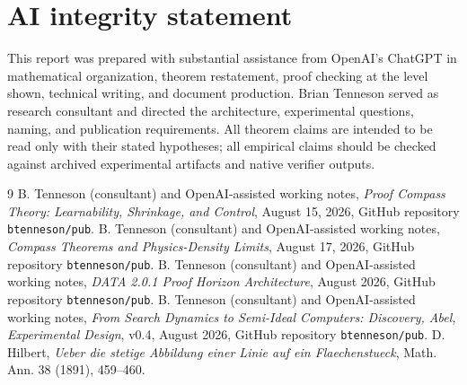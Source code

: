 \documentclass[11pt]{article}
\begin{document}
\section*{AI integrity statement}
This report was prepared with substantial assistance from OpenAI's ChatGPT in mathematical organization, theorem restatement, proof checking at the level shown, technical writing, and document production. Brian Tenneson served as research consultant and directed the architecture, experimental questions, naming, and publication requirements. All theorem claims are intended to be read only with their stated hypotheses; all empirical claims should be checked against archived experimental artifacts and native verifier outputs.
\begin{thebibliography}{9}
 B. Tenneson (consultant) and OpenAI-assisted working notes, \emph{Proof Compass Theory: Learnability, Shrinkage, and Control}, August 15, 2026, GitHub repository \texttt{btenneson/pub}.
 B. Tenneson (consultant) and OpenAI-assisted working notes, \emph{Compass Theorems and Physics-Density Limits}, August 17, 2026, GitHub repository \texttt{btenneson/pub}.
 B. Tenneson (consultant) and OpenAI-assisted working notes, \emph{DATA 2.0.1 Proof Horizon Architecture}, August 2026, GitHub repository \texttt{btenneson/pub}.
 B. Tenneson (consultant) and OpenAI-assisted working notes, \emph{From Search Dynamics to Semi-Ideal Computers: Discovery, Abel, Experimental Design}, v0.4, August 2026, GitHub repository \texttt{btenneson/pub}.
 D. Hilbert, \emph{Ueber die stetige Abbildung einer Linie auf ein Flaechenstueck}, Math. Ann. 38 (1891), 459--460.
\end{thebibliography}
\end{document}

